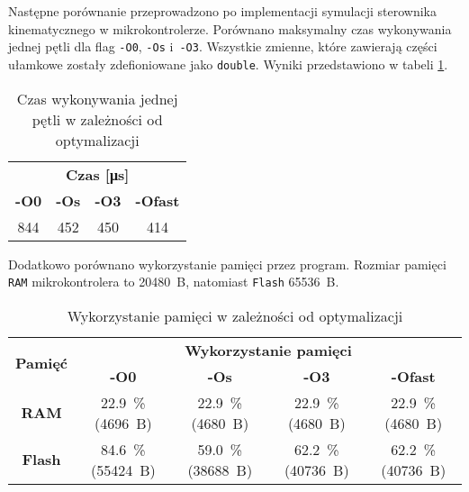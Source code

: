         Następne porównanie przeprowadzono po implementacji symulacji sterownika kinematycznego w mikrokontrolerze. Porównano maksymalny czas wykonywania jednej pętli dla flag \texttt{-O0}, \texttt{-Os} i~\texttt{-O3}. Wszystkie zmienne, które zawierają części ułamkowe zostały zdefioniowane jako \texttt{double}. Wyniki przedstawiono w tabeli \ref{tab:czasTrwaniaObliczeńSterownik}.
        \begin{table}[ht]
    		\centering
    		\begin{tabular}{|c|c|c|c|}
                \hline
                \multicolumn{4}{|c|}{\textbf{Czas [\si{\micro\second}]}}     \\ \cline{1-4} 
                 \textbf{-O0} & \textbf{-Os}   & \textbf{-O3} & \textbf{-Ofast}       \\ \hline \hline
                   844    & 452 & 450 & 414     \\ \hline
                \end{tabular}
    		\caption{Czas wykonywania jednej pętli w zależności od optymalizacji}
    		\label{tab:czasTrwaniaObliczeńSterownik}
    	\end{table}
    	
    	Dodatkowo porównano wykorzystanie pamięci przez program. Rozmiar pamięci \texttt{RAM} mikrokontrolera to \SI{20480}{B}, natomiast \texttt{Flash} \SI{65536}{B}.
    	\begin{table}[ht]
    		\centering
    		\begin{tabular}{|c|c|c|c|c|}
                \hline
                \multirow{ 2}{*}{\textbf{Pamięć}} & \multicolumn{4}{c|}{\textbf{Wykorzystanie pamięci}}     \\ \cline{2-5} 
                & \textbf{-O0} & \textbf{-Os}   & \textbf{-O3}   & \textbf{-Ofast}     \\ \hline \hline
                 \textbf{RAM}         & \SI{22.9}{\percent} (\SI{4696}{B})   & \SI{22.9}{\percent} (\SI{4680}{B}) & \SI{22.9}{\percent} (\SI{4680}{B}) & \SI{22.9}{\percent} (\SI{4680}{B})     \\ \hline
                 \textbf{Flash}           & \SI{84.6}{\percent} (\SI{55424}{B})    & \SI{59.0}{\percent} (\SI{38688}{B}) & \SI{62.2}{\percent} (\SI{40736}{B})  & \SI{62.2}{\percent} (\SI{40736}{B})     \\ \hline
                \end{tabular}
    		\caption{Wykorzystanie pamięci w zależności od optymalizacji}
    		\label{tab:wykorzystaniePamieciSterownik}
    	\end{table}
